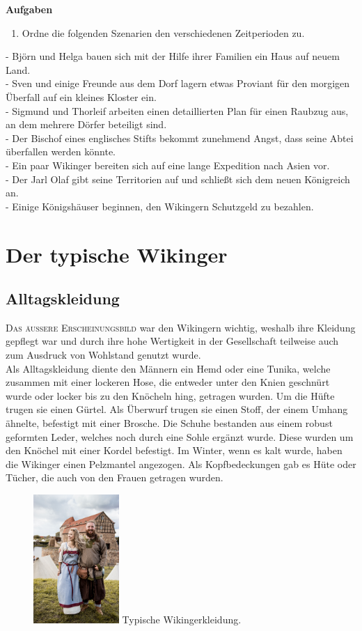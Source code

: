 \documentclass[12pt,a4paper,ngerman,openany]{book}
\newcommand{\flettrine}[2]{\lettrine[lines=2, depth=0, loversize=0.25, nindent=0.69pt, lraise=0.15]{\initfamily{#1}}{#2}}
\newcommand*\initfamily{\usefont{U}{GotIn}{xl}{n}}
\newcommand{\aufgaben}[1]{
  \begin{tcolorbox}
    \textbf{Aufgaben}
    \begin{enumerate}
      #1
    \end{enumerate}
  \end{tcolorbox}
} %
\newcommand{\fchapter}[1]{\chapter{#1}\thispagestyle{chapterstyle}}
\begin{document}
\vspace{0.2cm}

\aufgaben{
  \item Ordne die folgenden Szenarien den verschiedenen Zeitperioden zu.
}

- Björn und Helga bauen sich mit der Hilfe ihrer Familien ein Haus auf neuem Land.\\
- Sven und einige Freunde aus dem Dorf lagern etwas Proviant für den morgigen Überfall auf ein kleines Kloster ein.\\
- Sigmund und Thorleif arbeiten einen detaillierten Plan für einen Raubzug aus, an dem mehrere Dörfer beteiligt sind.\\
- Der Bischof eines englisches Stifts bekommt zunehmend Angst, dass seine Abtei überfallen werden könnte.\\
- Ein paar Wikinger bereiten sich auf eine lange Expedition nach Asien vor.\\
- Der Jarl Olaf gibt seine Territorien auf und schließt sich dem neuen Königreich an.\\
- Einige Königshäuser beginnen, den Wikingern Schutzgeld zu bezahlen.

\fchapter{Der typische Wikinger}

\section{Alltagskleidung}
\flettrine{D}{Das äussere Erscheinungsbild} war den Wikingern wichtig, weshalb ihre Kleidung gepflegt war und durch ihre hohe Wertigkeit in der Gesellschaft teilweise auch zum Ausdruck von Wohlstand genutzt wurde.\\
Als Alltagskleidung diente den Männern ein Hemd oder eine Tunika, welche zusammen mit einer lockeren Hose, die entweder unter den Knien geschnürt wurde oder locker bis zu den Knöcheln hing, getragen wurden. Um die Hüfte trugen sie einen Gürtel. Als Überwurf trugen sie einen Stoff, der einem Umhang ähnelte, befestigt mit einer Brosche. Die Schuhe bestanden aus einem robust geformten Leder, welches noch durch eine Sohle ergänzt wurde. Diese wurden um den Knöchel mit einer Kordel befestigt. Im Winter, wenn es kalt wurde, haben die Wikinger einen Pelzmantel angezogen. Als Kopfbedeckungen gab es Hüte oder Tücher, die auch von den Frauen getragen wurden.

\begin{figure}
  \centering
  \includegraphics[width=0.29\textwidth]{kleidung.jpg}
  Typische Wikingerkleidung.
\end{figure}
\end{document}
